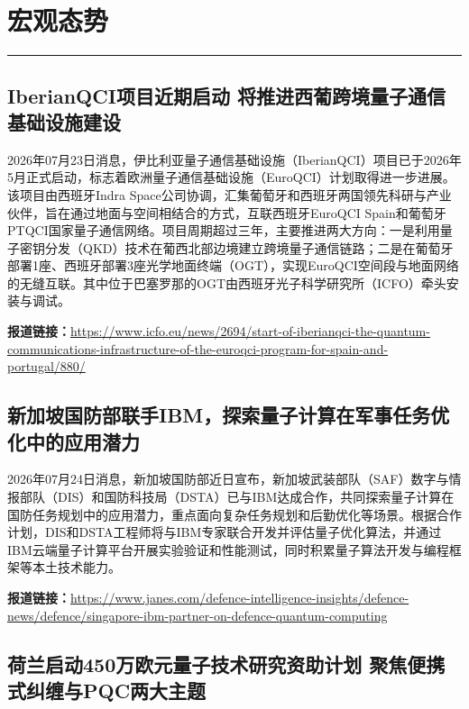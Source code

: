 \documentclass[12pt,a4paper]{ctexart}
\begin{document}
\newpage
\section{宏观态势}
\vspace{-0.5em}
\noindent\rule{\linewidth}{1.5pt}

\subsection{ IberianQCI项目近期启动 将推进西葡跨境量子通信基础设施建设 }

2026年07月23日消息，伊比利亚量子通信基础设施（IberianQCI）项目已于2026年5月正式启动，标志着欧洲量子通信基础设施（EuroQCI）计划取得进一步进展。该项目由西班牙Indra Space公司协调，汇集葡萄牙和西班牙两国领先科研与产业伙伴，旨在通过地面与空间相结合的方式，互联西班牙EuroQCI Spain和葡萄牙PTQCI国家量子通信网络。项目周期超过三年，主要推进两大方向：一是利用量子密钥分发（QKD）技术在葡西北部边境建立跨境量子通信链路；二是在葡萄牙部署1座、西班牙部署3座光学地面终端（OGT），实现EuroQCI空间段与地面网络的无缝互联。其中位于巴塞罗那的OGT由西班牙光子科学研究所（ICFO）牵头安装与调试。

\noindent\textbf{报道链接：}\url{https://www.icfo.eu/news/2694/start-of-iberianqci-the-quantum-communications-infrastructure-of-the-euroqci-program-for-spain-and-portugal/880/}

\subsection{ 新加坡国防部联手IBM，探索量子计算在军事任务优化中的应用潜力 }

2026年07月24日消息，新加坡国防部近日宣布，新加坡武装部队（SAF）数字与情报部队（DIS）和国防科技局（DSTA）已与IBM达成合作，共同探索量子计算在国防任务规划中的应用潜力，重点面向复杂任务规划和后勤优化等场景。根据合作计划，DIS和DSTA工程师将与IBM专家联合开发并评估量子优化算法，并通过IBM云端量子计算平台开展实验验证和性能测试，同时积累量子算法开发与编程框架等本土技术能力。

\noindent\textbf{报道链接：}\url{https://www.janes.com/defence-intelligence-insights/defence-news/defence/singapore-ibm-partner-on-defence-quantum-computing}

\subsection{ 荷兰启动450万欧元量子技术研究资助计划 聚焦便携式纠缠与PQC两大主题 }
\end{document}
